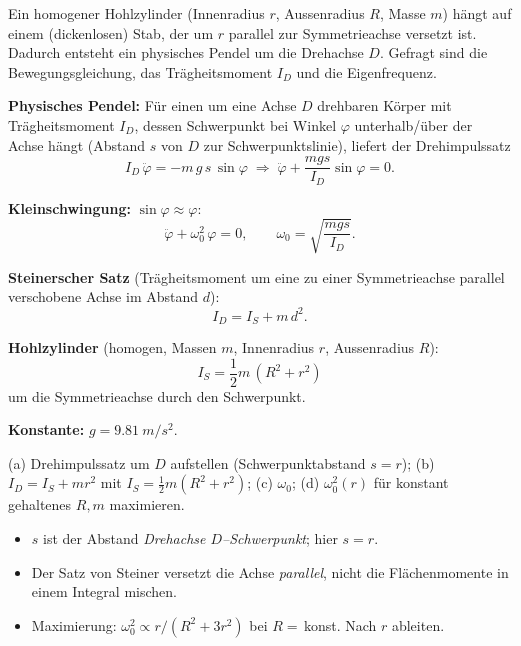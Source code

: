 
Ein homogener Hohlzylinder (Innenradius $r$, Aussenradius $R$, Masse $m$)
hängt auf einem (dickenlosen) Stab, der um $r$ parallel zur Symmetrieachse
versetzt ist. Dadurch entsteht ein physisches Pendel um die Drehachse $D$.
Gefragt sind die Bewegungsgleichung, das Trägheitsmoment $I_D$ und die
Eigenfrequenz.

\begin{werkzeugkasten}[Werkzeuge]
\textbf{Physisches Pendel:} Für einen um eine Achse $D$ drehbaren Körper mit
Trägheitsmoment $I_D$, dessen Schwerpunkt bei Winkel $\varphi$ unterhalb/über
der Achse hängt (Abstand $s$ von $D$ zur Schwerpunktslinie), liefert der
Drehimpulssatz
\begin{equation}
  I_D\,\ddot\varphi = -m\,g\,s\,\sin\varphi
  \;\Rightarrow\;
  \ddot\varphi + \frac{m g s}{I_D}\sin\varphi = 0.
\end{equation}

\textbf{Kleinschwingung:} $\sin\varphi\approx\varphi$:
\begin{equation}
  \ddot\varphi + \omega_0^2\,\varphi=0,
  \qquad \omega_0 = \sqrt{\frac{m g s}{I_D}}.
\end{equation}

\textbf{Steinerscher Satz} (Trägheitsmoment um eine zu einer
Symmetrieachse parallel verschobene Achse im Abstand $d$):
\begin{equation}
  I_D = I_S + m\,d^2.
\end{equation}

\textbf{Hohlzylinder} (homogen, Massen $m$, Innenradius $r$, Aussenradius $R$):
\begin{equation}
  I_S = \frac12 m\,(R^2+r^2)
\end{equation}
um die Symmetrieachse durch den Schwerpunkt.

\textbf{Konstante:} $g=\qty{9.81}{m/s^2}$.
\end{werkzeugkasten}

\begin{werkzeugkasten}
(a) Drehimpulssatz um $D$ aufstellen (Schwerpunktabstand $s=r$); (b)
$I_D=I_S+m r^2$ mit $I_S=\frac12 m(R^2+r^2)$; (c) $\omega_0$; (d)
$\omega_0^2(r)$ für konstant gehaltenes $R,m$ maximieren.
\end{werkzeugkasten}

\begin{achtung}
\begin{itemize}
  \item $s$ ist der Abstand \emph{Drehachse $D$--Schwerpunkt}; hier $s=r$.
  \item Der Satz von Steiner versetzt die Achse \emph{parallel}, nicht die
       Flächenmomente in einem Integral mischen.
  \item Maximierung: $\omega_0^2\propto r/(R^2+3r^2)$ bei $R=$\,konst. Nach
       $r$ ableiten.
\end{itemize}
\end{achtung}
